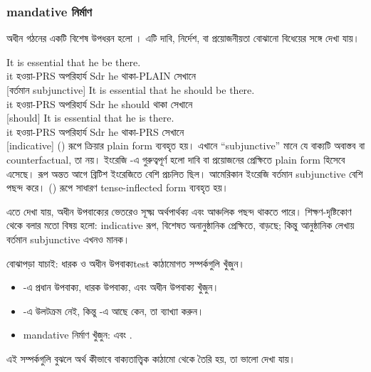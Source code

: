 \subsubsection*{mandative নির্মাণ}

অধীন গঠনের একটি বিশেষ উপধরন হলো । এটি দাবি, নির্দেশ, বা প্রয়োজনীয়তা বোঝানো বিধেয়ের সঙ্গে দেখা যায়।

\ea \label{ex:mandative-bn}
    \ea \gll It is essential {\ob}that he be there{\cb}.\\
        it হওয়া-PRS অপরিহার্য Sdr he থাকা-PLAIN সেখানে\\
    \glt {} [বর্তমান subjunctive]
    \ex \gll It is essential {\ob}that he should be there{\cb}.\\
        it হওয়া-PRS অপরিহার্য Sdr he should থাকা সেখানে\\
    \glt {} [should]
    \ex \gll It is essential {\ob}that he is there{\cb}.\\
        it হওয়া-PRS অপরিহার্য Sdr he থাকা-PRS সেখানে\\
    \glt {} [indicative]
    \z
\z
{} () রূপে ক্রিয়ার plain form ব্যবহৃত হয়। এখানে \enquote{subjunctive} মানে যে বাক্যটি অবাস্তব বা counterfactual, তা নয়। ইংরেজি -এ গুরুত্বপূর্ণ হলো দাবি বা প্রয়োজনের প্রেক্ষিতে  plain form হিসেবে এসেছে।  রূপ অন্তত আগে ব্রিটিশ ইংরেজিতে বেশি প্রচলিত ছিল। আমেরিকান ইংরেজি বর্তমান subjunctive বেশি পছন্দ করে।  () রূপে সাধারণ tense-inflected form ব্যবহৃত হয়।

এতে দেখা যায়, অধীন উপবাক্যের ভেতরেও সূক্ষ্ম অর্থপার্থক্য এবং আঞ্চলিক পছন্দ থাকতে পারে। শিক্ষণ-দৃষ্টিকোণ থেকে বলার মতো বিষয় হলো: indicative রূপ, বিশেষত অনানুষ্ঠানিক প্রেক্ষিতে, বাড়ছে; কিন্তু আনুষ্ঠানিক লেখায় বর্তমান subjunctive এখনও মানক।

\begin{tblsframedsymbol}{বোঝাপড়া যাচাই: ধারক ও অধীন উপবাক্য}{test}
কাঠামোগত সম্পর্কগুলি খুঁজুন।
\begin{itemize}[noitemsep, leftmargin=*]
    \item {}-এ প্রধান উপবাক্য, ধারক উপবাক্য, এবং অধীন উপবাক্য খুঁজুন।
    \item {}-এ উলটক্রম নেই, কিন্তু -এ আছে কেন, তা ব্যাখ্যা করুন।
    \item mandative নির্মাণ খুঁজুন:  এবং .
\end{itemize}
এই সম্পর্কগুলি বুঝলে অর্থ কীভাবে বাক্যতাত্ত্বিক কাঠামো থেকে তৈরি হয়, তা ভালো দেখা যায়।
\end{tblsframedsymbol}

